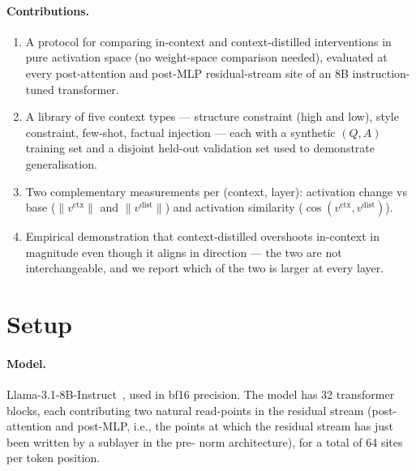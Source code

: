\documentclass[letterpaper]{article} %
\begin{document}
\paragraph{Contributions.}
\begin{enumerate}
\item A protocol for comparing in-context and context-distilled
  interventions in pure activation space (no weight-space comparison
  needed), evaluated at every post-attention and post-MLP
  residual-stream site of an 8B instruction-tuned transformer.
\item A library of five context types --- structure constraint (high
  and low), style constraint, few-shot, factual injection --- each with
  a synthetic $(Q, A)$ training set and a disjoint held-out validation
  set used to demonstrate generalisation.
\item Two complementary measurements per (context, layer): activation
  change vs base ($\|v^\text{ctx}\|$ and $\|v^\text{dist}\|$) and
  activation similarity ($\cos(v^\text{ctx}, v^\text{dist})$).
\item Empirical demonstration that context-distilled overshoots
  in-context in magnitude even though it aligns in direction --- the
  two are not interchangeable, and we report which of the two is
  larger at every layer.
\end{enumerate}

\section{Setup}
\label{sec:setup}

\paragraph{Model.}
Llama-3.1-8B-Instruct~\citep{dubey2024llama}, used in bf16 precision. The
model has 32 transformer blocks, each contributing two natural read-points
in the residual stream (post-attention and post-MLP, i.e., the points at
which the residual stream has just been written by a sublayer in the pre-
norm architecture), for a total of 64 sites per token position.
\end{document}
